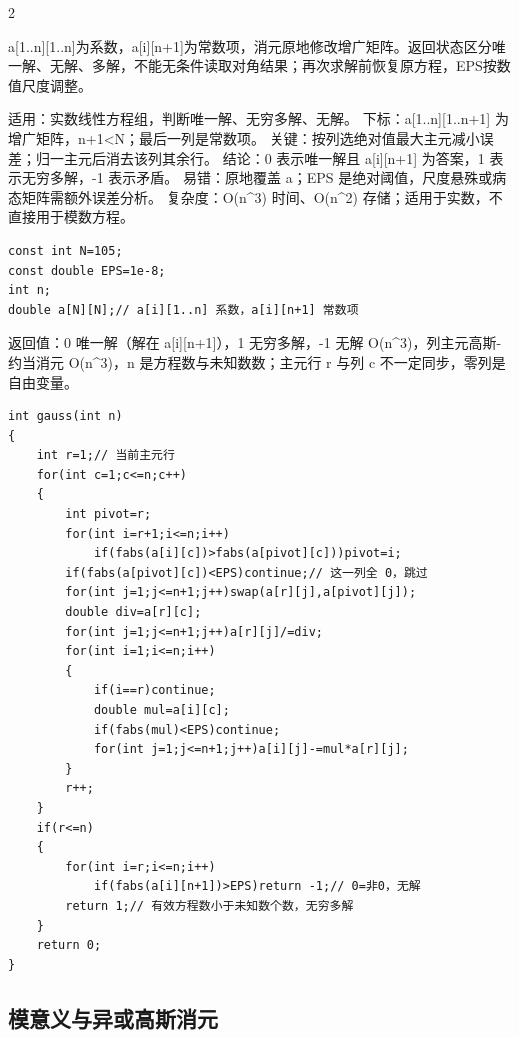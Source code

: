 \documentclass[UTF8,fontset=fandol,a4paper,twoside]{ctexart}
\newcommand{\note}[1]{{\fontsize{10}{12}\selectfont #1\par}}
\begin{document}
\begin{multicols}{2}
\note{a[\allowbreak{}1.\allowbreak{}.\allowbreak{}n]\allowbreak{}[\allowbreak{}1.\allowbreak{}.\allowbreak{}n]\allowbreak{}为系数，a[\allowbreak{}i]\allowbreak{}[\allowbreak{}n+\allowbreak{}1]\allowbreak{}为常数项，消元原地修改增广矩阵。返回状态区分唯一解、无解、多解，不能无条件读取对角结果；再次求解前恢复原方程，EPS按数值尺度调整。}
\note{适用：实数线性方程组，判断唯一解、无穷多解、无解。 下标：a[\allowbreak{}1.\allowbreak{}.\allowbreak{}n]\allowbreak{}[\allowbreak{}1.\allowbreak{}.\allowbreak{}n+\allowbreak{}1]\allowbreak{} 为增广矩阵，n+\allowbreak{}1<\allowbreak{}N；最后一列是常数项。 关键：按列选绝对值最大主元减小误差；归一主元后消去该列其余行。 结论：0 表示唯一解且 a[\allowbreak{}i]\allowbreak{}[\allowbreak{}n+\allowbreak{}1]\allowbreak{} 为答案，1 表示无穷多解，-\allowbreak{}1 表示矛盾。 易错：原地覆盖 a；EPS 是绝对阈值，尺度悬殊或病态矩阵需额外误差分析。 复杂度：O(\allowbreak{}n\textasciicircum{}3)\allowbreak{} 时间、O(\allowbreak{}n\textasciicircum{}2)\allowbreak{} 存储；适用于实数，不直接用于模数方程。}
\begin{lstlisting}
const int N=105;
const double EPS=1e-8;
int n;
double a[N][N];// a[i][1..n] 系数，a[i][n+1] 常数项
\end{lstlisting}
\note{返回值：0 唯一解（解在 a[\allowbreak{}i]\allowbreak{}[\allowbreak{}n+\allowbreak{}1]\allowbreak{}），1 无穷多解，-\allowbreak{}1 无解 O(\allowbreak{}n\textasciicircum{}3)\allowbreak{}，列主元高斯-\allowbreak{}约当消元 O(\allowbreak{}n\textasciicircum{}3)\allowbreak{}，n 是方程数与未知数数；主元行 r 与列 c 不一定同步，零列是自由变量。}
\begin{lstlisting}
int gauss(int n)
{
    int r=1;// 当前主元行
    for(int c=1;c<=n;c++)
    {
        int pivot=r;
        for(int i=r+1;i<=n;i++)
            if(fabs(a[i][c])>fabs(a[pivot][c]))pivot=i;
        if(fabs(a[pivot][c])<EPS)continue;// 这一列全 0，跳过
        for(int j=1;j<=n+1;j++)swap(a[r][j],a[pivot][j]);
        double div=a[r][c];
        for(int j=1;j<=n+1;j++)a[r][j]/=div;
        for(int i=1;i<=n;i++)
        {
            if(i==r)continue;
            double mul=a[i][c];
            if(fabs(mul)<EPS)continue;
            for(int j=1;j<=n+1;j++)a[i][j]-=mul*a[r][j];
        }
        r++;
    }
    if(r<=n)
    {
        for(int i=r;i<=n;i++)
            if(fabs(a[i][n+1])>EPS)return -1;// 0=非0，无解
        return 1;// 有效方程数小于未知数个数，无穷多解
    }
    return 0;
}
\end{lstlisting}
\subsection{模意义与异或高斯消元}


\end{multicols}
\end{document}
